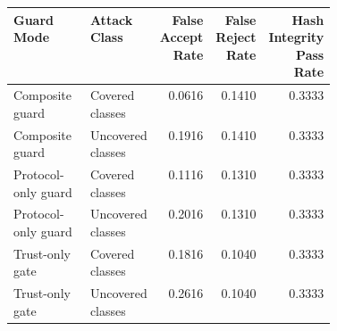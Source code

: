 \begin{tabular}{p{0.24\linewidth}p{0.18\linewidth}rrr}
\hline
Guard Mode & Attack Class & False Accept Rate & False Reject Rate & Hash Integrity Pass Rate \\
\hline
Composite guard & Covered classes & 0.0616 & 0.1410 & 0.3333 \\
Composite guard & Uncovered classes & 0.1916 & 0.1410 & 0.3333 \\
Protocol-only guard & Covered classes & 0.1116 & 0.1310 & 0.3333 \\
Protocol-only guard & Uncovered classes & 0.2016 & 0.1310 & 0.3333 \\
Trust-only gate & Covered classes & 0.1816 & 0.1040 & 0.3333 \\
Trust-only gate & Uncovered classes & 0.2616 & 0.1040 & 0.3333 \\
\hline
\end{tabular}
